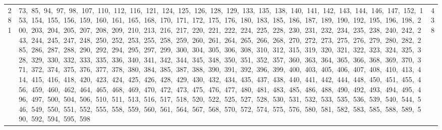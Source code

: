 \begin{longtable}{c|p{}|r}
281 & 73,\ 85,\ 94,\ 97,\ 98,\ 107,\ 110,\ 112,\ 116,\ 121,\ 124,\ 125,\ 126,\ 128,\ 129,\ 133,\ 135,\ 138,\ 140,\ 141,\ 142,\ 143,\ 144,\ 146,\ 147,\ 152,\ 153,\ 154,\ 155,\ 156,\ 159,\ 160,\ 161,\ 165,\ 168,\ 170,\ 171,\ 172,\ 175,\ 176,\ 180,\ 183,\ 185,\ 186,\ 187,\ 189,\ 190,\ 192,\ 195,\ 196,\ 198,\ 200,\ 203,\ 204,\ 205,\ 207,\ 208,\ 209,\ 210,\ 213,\ 216,\ 217,\ 220,\ 221,\ 222,\ 224,\ 225,\ 228,\ 230,\ 231,\ 232,\ 234,\ 235,\ 238,\ 240,\ 242,\ 243,\ 244,\ 245,\ 247,\ 248,\ 250,\ 252,\ 253,\ 255,\ 258,\ 259,\ 260,\ 261,\ 264,\ 265,\ 266,\ 268,\ 270,\ 272,\ 273,\ 275,\ 276,\ 279,\ 280,\ 282,\ 285,\ 286,\ 287,\ 288,\ 290,\ 292,\ 294,\ 295,\ 297,\ 299,\ 300,\ 304,\ 305,\ 306,\ 308,\ 310,\ 312,\ 315,\ 319,\ 320,\ 321,\ 322,\ 323,\ 324,\ 325,\ 328,\ 329,\ 330,\ 332,\ 333,\ 335,\ 336,\ 340,\ 341,\ 342,\ 344,\ 345,\ 348,\ 350,\ 351,\ 352,\ 357,\ 360,\ 363,\ 364,\ 365,\ 366,\ 368,\ 369,\ 370,\ 371,\ 372,\ 374,\ 375,\ 376,\ 377,\ 378,\ 380,\ 384,\ 385,\ 387,\ 388,\ 390,\ 391,\ 392,\ 396,\ 399,\ 400,\ 403,\ 405,\ 406,\ 407,\ 408,\ 410,\ 413,\ 414,\ 415,\ 416,\ 418,\ 420,\ 423,\ 424,\ 425,\ 426,\ 428,\ 429,\ 430,\ 432,\ 434,\ 435,\ 437,\ 438,\ 440,\ 441,\ 442,\ 444,\ 448,\ 450,\ 451,\ 455,\ 456,\ 459,\ 460,\ 462,\ 464,\ 465,\ 468,\ 469,\ 470,\ 472,\ 473,\ 475,\ 476,\ 477,\ 480,\ 481,\ 483,\ 485,\ 486,\ 488,\ 490,\ 492,\ 493,\ 494,\ 495,\ 496,\ 497,\ 500,\ 504,\ 506,\ 510,\ 511,\ 513,\ 516,\ 517,\ 518,\ 520,\ 522,\ 525,\ 527,\ 528,\ 530,\ 531,\ 532,\ 533,\ 535,\ 536,\ 539,\ 540,\ 544,\ 546,\ 549,\ 550,\ 551,\ 552,\ 555,\ 558,\ 559,\ 560,\ 561,\ 564,\ 567,\ 568,\ 570,\ 572,\ 574,\ 575,\ 576,\ 580,\ 581,\ 582,\ 583,\ 585,\ 588,\ 589,\ 590,\ 592,\ 594,\ 595,\ 598 & 438 \\

\end{longtable}
